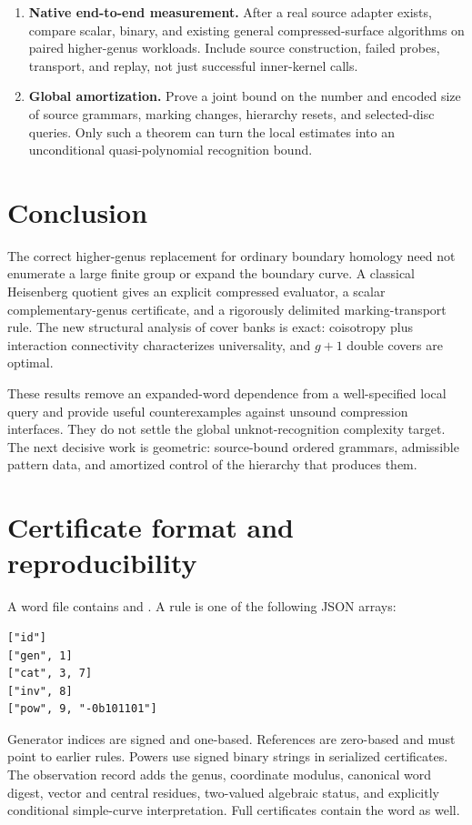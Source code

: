 \documentclass[11pt,letterpaper]{article}
\theoremstyle{definition}
\theoremstyle{remark}
\newcommand{\code}[1]{\texttt{\detokenize{#1}}}
\begin{document}
\begin{enumerate}[label=\textbf{Q\arabic*.},leftmargin=*]
\item \textbf{Native end-to-end measurement.} After a real source adapter exists, compare scalar, binary, and existing general compressed-surface algorithms on paired higher-genus workloads. Include source construction, failed probes, transport, and replay, not just successful inner-kernel calls.
\item \textbf{Global amortization.} Prove a joint bound on the number and encoded size of source grammars, marking changes, hierarchy resets, and selected-disc queries. Only such a theorem can turn the local estimates into an unconditional quasi-polynomial recognition bound.
\end{enumerate}

\section{Conclusion}
The correct higher-genus replacement for ordinary boundary homology need not enumerate a large finite group or expand the boundary curve. A classical Heisenberg quotient gives an explicit compressed evaluator, a scalar complementary-genus certificate, and a rigorously delimited marking-transport rule. The new structural analysis of cover banks is exact: coisotropy plus interaction connectivity characterizes universality, and $g+1$ double covers are optimal.

These results remove an expanded-word dependence from a well-specified local query and provide useful counterexamples against unsound compression interfaces. They do not settle the global unknot-recognition complexity target. The next decisive work is geometric: source-bound ordered grammars, admissible pattern data, and amortized control of the hierarchy that produces them.

\appendix
\section{Certificate format and reproducibility}
A word file contains \code{rules} and \code{root}. A rule is one of the following JSON arrays:
\begin{verbatim}
["id"]
["gen", 1]
["cat", 3, 7]
["inv", 8]
["pow", 9, "-0b101101"]
\end{verbatim}
Generator indices are signed and one-based. References are zero-based and must point to earlier rules. Powers use signed binary strings in serialized certificates. The observation record adds the genus, coordinate modulus, canonical word digest, vector and central residues, two-valued algebraic status, and explicitly conditional simple-curve interpretation. Full certificates contain the word as well.
\end{document}

